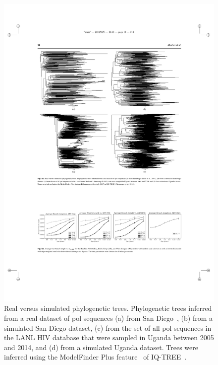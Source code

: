 \begin{figure} %
\centering
\includegraphics[width=\textwidth]{figs/favites-trees}
\caption[Real vs. Simulated Viral Phylogenies]
{Real versus simulated phylogenetic trees. Phylogenetic trees inferred from a real dataset of \gls{pol} sequences (a) from San Diego~\cite{Little2014}, (b) from a simulated San Diego dataset, (c) from the set of all \gls{pol} sequences in the \gls{LANL} \gls{HIV} database that were sampled in Uganda between 2005 and 2014, and (d) from a simulated Uganda dataset. Trees were inferred using the ModelFinder Plus feature~\cite{Kalyaanamoorthy2017} of IQ-TREE~\cite{Chernomor2016}.}
\label{fig:favites-trees}
\end{figure}

